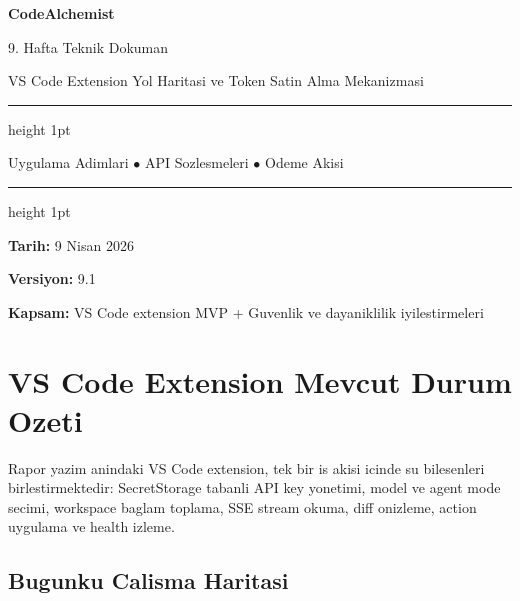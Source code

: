\documentclass[11pt,a4paper]{article}
\begin{document}
\begin{titlepage}
	\centering
	\vspace*{3cm}
	{\Huge\bfseries\color{codeblue} CodeAlchemist\par}
	\vspace{0.5cm}
	{\Large 9. Hafta Teknik Dokuman\par}
	\vspace{0.3cm}
	{\large VS Code Extension Yol Haritasi ve Token Satin Alma Mekanizmasi\par}
	\vspace{1.8cm}
	\hrule height 1pt
	\vspace{0.4cm}
	{\normalsize Uygulama Adimlari \quad $\bullet$ \quad API Sozlesmeleri \quad $\bullet$ \quad Odeme Akisi\par}
	\vspace{0.4cm}
	\hrule height 1pt
	\vfill
	{\normalsize\textbf{Tarih:} 9 Nisan 2026\par}
	\vspace{0.2cm}
	{\normalsize\textbf{Versiyon:} 9.1\par}
	\vspace{0.2cm}
	{\normalsize\textbf{Kapsam:} VS Code extension MVP + Guvenlik ve dayaniklilik iyilestirmeleri\par}
\end{titlepage}

\section{VS Code Extension Mevcut Durum Ozeti}

\begin{notebox}
Rapor yazim anindaki VS Code extension, tek bir is akisi icinde su bilesenleri birlestirmektedir: SecretStorage tabanli API key yonetimi, model ve agent mode secimi, workspace baglam toplama, SSE stream okuma, diff onizleme, action uygulama ve health izleme.
\end{notebox}

\subsection{Bugunku Calisma Haritasi}
\end{document}
